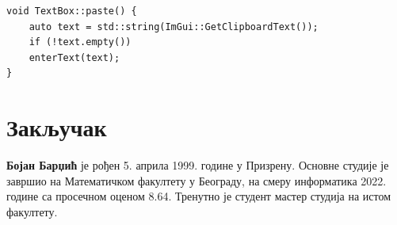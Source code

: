 \documentclass[12pt,oneside]{memoir}
\begin{document}
\begin{verbatim}
void TextBox::paste() {
	auto text = std::string(ImGui::GetClipboardText());
	if (!text.empty())
	enterText(text);
}
\end{verbatim}


\chapter{Закључак}
\pangrami

\literatura

\backmatter

\begin{biografija}
\textbf{Бојан Барџић} је рођен 5. априла 1999. године у Призрену. Основне студије
је завршио на Математичком факултету у Београду, на смеру информатика 2022. године
са просечном оценом 8.64. Тренутно је студент мастер студија на истом факултету.
\end{biografija}
\end{document}
